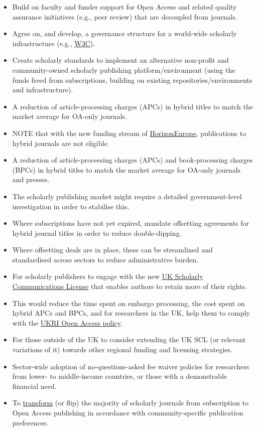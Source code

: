 \begin{itemize}
\item
  Build on faculty and funder support for Open Access and related
  quality assurance initiatives (e.g., peer review) that are decoupled
  from journals.
\item
  Agree on, and develop, a governance structure for a world-wide
  scholarly infrastructure (e.g., \href{https://www.w3.org/}{W3C}).
\item
  Create scholarly standards to implement an alternative non-profit and
  community-owned scholarly publishing platform/environment (using the
  funds freed from subscriptions, building on existing
  repositories/environments and infrastructure).
\item
  A reduction of article-processing charges (APCs) in hybrid titles to
  match the market average for OA-only journals.
\item
  NOTE that with the new funding stream of
  \href{https://ec.europa.eu/info/designing-next-research-and-innovation-framework-programme/what-shapes-next-framework-programme_en}{HorizonEurope},
  publications to hybrid journals are not eligible.
\item
  A reduction of article-processing charges (APCs) and book-processing
  charges (BPCs) in hybrid titles to match the market average for
  OA-only journals and presses.
\item
  The scholarly publishing market might require a detailed
  government-level investigation in order to stabilise this.
\item
  Where subscriptions have not yet expired, mandate offsetting
  agreements for hybrid journal titles in order to reduce
  double-dipping.
\item
  Where offsetting deals are in place, these can be streamlined and
  standardised across sectors to reduce administrative burden.
\item
  For scholarly publishers to engage with the new
  \href{http://ukscl.ac.uk/}{UK Scholarly Communications License} that
  enables authors to retain more of their rights.
\item
  This would reduce the time spent on embargo processing, the cost spent
  on hybrid APCs and BPCs, and for researchers in the UK, help them to
  comply with the
  \href{https://www.ukri.org/funding/information-for-award-holders/open-access/open-access-policy/}{UKRI
  Open Access policy}.
\item
  For those outside of the UK to consider extending the UK SCL (or
  relevant variations of it) towards other regional funding and
  licensing strategies.
\item
  Sector-wide adoption of no-questions-asked fee waiver policies for
  researchers from lower- to middle-income countries, or those with a
  demonstrable financial need.
\item
  To
  \href{https://nrs.harvard.edu/urn-3:HUL.InstRepos:27803834}{transform}
  (or flip) the majority of scholarly journals from subscription to Open
  Access publishing in accordance with community-specific publication
  preferences.
\end{itemize}

